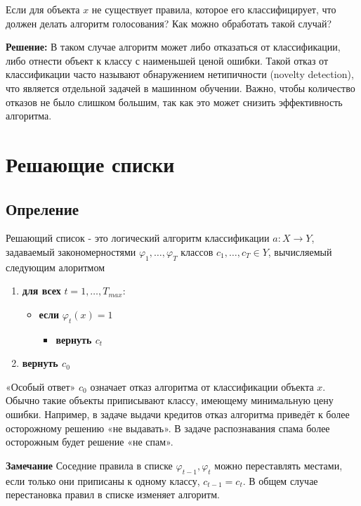 Если для объекта $x$ не существует правила, которое его классифицирует, что должен делать алгоритм голосования? Как можно обработать такой случай?

\textbf{Решение:}  
В таком случае алгоритм может либо отказаться от классификации, либо отнести объект к классу с наименьшей ценой ошибки. Такой отказ от классификации часто называют обнаружением нетипичности (novelty detection), что является отдельной задачей в машинном обучении. Важно, чтобы количество отказов не было слишком большим, так как это может снизить эффективность алгоритма.

\section{Решающие списки}
\subsection{Опреление}
    Решающий список - это логический алгоритм классификации $a: X \xrightarrow{} Y$, задаваемый закономерностями $\varphi_1, \dots, \varphi_T$ классов $c_1, \dots, c_T \in Y$, вычисляемый следующим алоритмом

\hline
\begin{enumerate}
    \item \textbf{для всех} $t = 1, \dots, T_{max}$:
    \begin{itemize}
        \item \textbf{если} $\varphi_t(x) = 1$ 
        \begin{itemize}
            \item \textbf{вернуть $c_t$}
        \end{itemize}
    \end{itemize}
    
    \item \textbf{вернуть $c_0$}
\end{enumerate}
\hline
«Особый ответ» $c_0$ означает отказ алгоритма от классификации объекта $x$.
Обычно такие объекты приписывают классу, имеющему минимальную цену ошибки.
Например, в задаче выдачи кредитов отказ алгоритма приведёт к более осторожному решению «не выдавать». В задаче распознавания спама более осторожным будет
решение «не спам».

\textbf{Замечание} Соседние правила в списке $\varphi_{t-1}, \varphi_t$ можно переставлять местами,
если только они приписаны к одному классу, $c_{t-1} = c_t$. В общем случае перестановка
правил в списке изменяет алгоритм.

